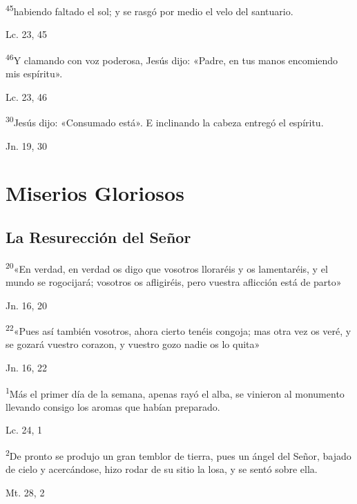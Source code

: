 \documentclass[a4paper,11pt]{article}
\begin{document}
      \textsuperscript{45}habiendo faltado el sol; y se rasgó por medio el velo del santuario.
      \begin{flushright}
        Lc. 23, 45
      \end{flushright}

      \textsuperscript{46}Y clamando con voz poderosa, Jesús dijo: «Padre, en tus manos encomiendo mis espíritu».
      \begin{flushright}
        Lc. 23, 46 
      \end{flushright}

      \textsuperscript{30}Jesús dijo: «Consumado está». E inclinando la cabeza entregó el espíritu.
      \begin{flushright}
        Jn. 19, 30
      \end{flushright}
 
    \newpage
         
  \section*{\hfil Miserios Gloriosos \hfil}
    \subsection*{\hfil La Resurección del Señor \hfil}
      
      \textsuperscript{20}«En verdad, en verdad os digo que vosotros lloraréis y os lamentaréis, y el mundo se rogocijará;
      vosotros os afligiréis, pero vuestra aflicción está de parto»
      \begin{flushright}
        Jn. 16, 20        
      \end{flushright}

      \textsuperscript{22}«Pues así también vosotros, ahora cierto tenéis congoja; mas otra vez os veré, y se gozará vuestro corazon,
      y vuestro gozo nadie os lo quita»
      \begin{flushright}
        Jn. 16, 22       
      \end{flushright}

      \textsuperscript{1}Más el primer día de la semana, apenas rayó el alba, se vinieron al monumento llevando consigo los aromas
      que habían preparado.
      \begin{flushright}
        Lc. 24, 1        
      \end{flushright}

      \textsuperscript{2}De pronto se produjo un gran temblor de tierra, pues un ángel del Señor, bajado de cielo y acercándose, hizo rodar
      de su sitio la losa, y se sentó sobre ella.
      \begin{flushright}
        Mt. 28, 2        
      \end{flushright}      
      
\end{document}
